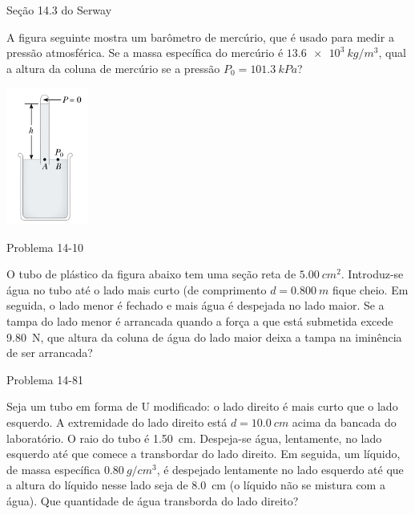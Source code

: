 \begin{frame}{Seção 14.3 do Serway}
    \begin{minipage}{\textwidth}
        A figura seguinte mostra um barômetro de mercúrio, que é usado para
        medir a pressão atmosférica. Se a massa específica do mercúrio é
        $\SI{13.6e3}{kg/m^3}$, qual a altura da coluna de mercúrio se a pressão
        $P_0 = \SI{101.3}{kPa}$?
    \end{minipage}
    \begin{center}
        \includegraphics[width=0.2\textwidth]{images/barometro}
    \end{center}
\end{frame}

\begin{frame}{Problema 14-10}
    \begin{minipage}{\textwidth}
        O tubo de plástico da figura abaixo tem uma seção reta de \(\SI{5,00}{cm^2}\).
        Introduz-se água no tubo até o lado mais curto (de comprimento \(d= \SI{0,800}{m}\) fique
        cheio. Em seguida, o lado menor é fechado e mais água é despejada no lado maior. Se a tampa do lado menor
        é arrancada quando a força a que está submetida excede \SI{9,80}{N}, que altura da coluna de água do lado
        maior deixa a tampa na iminência de ser arrancada?
    \end{minipage}

    \vspace{1cm}\centering
\end{frame}

\begin{frame}{Problema 14-81}
    \begin{minipage}{\textwidth}
        Seja um tubo em forma de U modificado: o lado direito é mais curto que o lado
        esquerdo. A extremidade do lado direito está \(d=\SI{10,0}{cm}\) acima da bancada do laboratório.
        O raio do tubo é \SI{1,50}{cm}. Despeja-se água, lentamente, no lado esquerdo até que comece a
        transbordar do lado direito. Em seguida, um líquido, de massa específica \(\SI{0,80}{g/cm^3}\), é despejado
        lentamente no lado esquerdo até que a altura do líquido nesse lado seja de \SI{8,0}{cm} (o líquido não
        se mistura com a água). Que quantidade de água transborda do lado direito?
    \end{minipage}
\end{frame}

